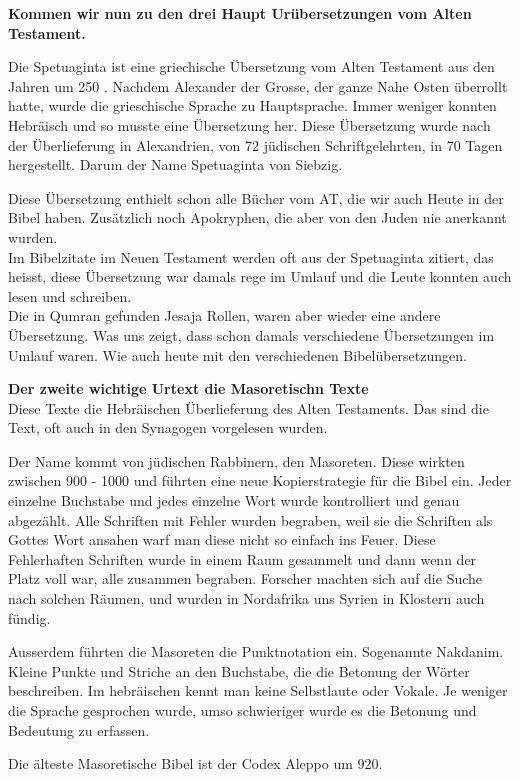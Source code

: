 \documentclass[fontsize=16pt]{mybib}
\begin{document}
\begin{otsblock}
    \textbf{Kommen wir nun zu den drei Haupt Urübersetzungen vom Alten Testament.}

    Die Spetuaginta ist eine griechische Übersetzung vom Alten Testament aus den Jahren um 250 \vChr. Nachdem Alexander der Grosse, der ganze Nahe Osten überrollt hatte, wurde die grieschische Sprache zu Hauptsprache. Immer weniger konnten Hebräisch und so musste eine Übersetzung her. Diese Übersetzung wurde nach der Überlieferung in Alexandrien, von 72 jüdischen Schriftgelehrten, in 70 Tagen hergestellt. Darum der Name Spetuaginta von Siebzig.

    Diese Übersetzung enthielt schon alle Bücher vom AT, die wir auch Heute in der Bibel haben. Zusätzlich noch Apokryphen, die aber von den Juden nie anerkannt wurden.\\
    Im Bibelzitate im Neuen Testament werden oft aus der Spetuaginta zitiert, das heisst, diese Übersetzung war damals rege im Umlauf und die Leute konnten auch lesen und schreiben.\\

    Die in Qumran gefunden Jesaja Rollen, waren aber wieder eine andere Übersetzung. Was uns zeigt, dass schon damals verschiedene Übersetzungen im Umlauf waren. Wie auch heute mit den verschiedenen Bibelübersetzungen.
\end{otsblock}
\begin{otsblock}
    \textbf{Der zweite wichtige Urtext die Masoretischn Texte}\\
    Diese Texte die Hebräischen Überlieferung des Alten Testaments. Das sind die Text, oft auch in den Synagogen vorgelesen wurden.

    Der Name kommt von jüdischen Rabbinern, den Masoreten. Diese wirkten zwischen 900 - 1000 \nChr{} und führten eine neue Kopierstrategie für die Bibel ein. Jeder einzelne Buchstabe und jedes einzelne Wort wurde kontrolliert und genau abgezählt. Alle Schriften mit Fehler wurden begraben, weil sie die Schriften als Gottes Wort ansahen warf man diese nicht so einfach ins Feuer. Diese Fehlerhaften Schriften wurde in einem Raum gesammelt und dann wenn der Platz voll war, alle zusammen begraben. Forscher machten sich auf die Suche nach solchen Räumen, und wurden in Nordafrika uns Syrien in Klostern auch fündig.

    Ausserdem führten die Masoreten die Punktnotation ein. Sogenannte Nakdanim. Kleine Punkte und Striche an den Buchstabe, die die Betonung der Wörter beschreiben. Im hebräischen kennt man keine Selbstlaute oder Vokale. Je weniger die Sprache gesprochen wurde, umso schwieriger wurde es die Betonung und Bedeutung zu erfassen.

    Die älteste Masoretische Bibel ist der Codex Aleppo um 920\nChr.
\end{otsblock}
\end{document}
